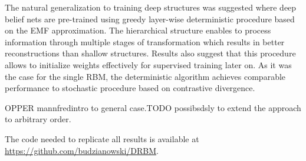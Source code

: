 The natural generalization to training deep structures was suggested where deep belief nets are pre-trained using greedy layer-wise deterministic procedure based on the EMF approximation. The hierarchical structure enables to process information through multiple stages of transformation which results in better reconstructions than shallow structures. Results also suggest that this procedure allows to initialize weights effectively for supervised training later on. As it was the case for the single RBM, the deterministic algorithm achieves comparable performance to stochastic procedure based on contrastive divergence.

OPPER  mannfredintro to general case.TODO possibsdsly to extend the approach to arbitrary order.

The code needed to replicate all results is available at \url{https://github.com/budzianowski/DRBM}. 

